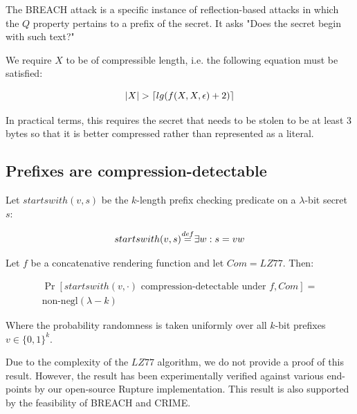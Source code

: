 \documentclass[conference, letterpaper, 10pt]{IEEEtran}
\DeclarePairedDelimiter{\ceil}{\lceil}{\rceil}
\newcommand\defeq{\stackrel{\mathclap{\normalfont\mbox{def}}}{=}}
\begin{document}
The BREACH attack is a specific instance of reflection-based attacks in which
the $Q$ property pertains to a prefix of the secret. It asks "Does the secret
begin with such text?"

We require $X$ to be of compressible length,
i.e. the following equation must be satisfied:

\begin{equation*}
    |X| > \ceil{lg(f(X, X, \epsilon) + 2)}
\end{equation*}

In practical terms, this requires the secret that needs to be stolen to be at
least 3 bytes so that it is better compressed rather than represented as a
literal.

\subsection{Prefixes are
compression-detectable}\label{subsec:breachprefix}

Let $startswith(v, s)$ be the $k$-length prefix checking predicate on a
$\lambda$-bit secret $s$:

\begin{equation*}
    startswith(v, s) \defeq \exists w: s = v w
\end{equation*}

Let $f$ be a concatenative rendering function and let $Com = LZ77$. Then:

\begin{align*}
\Pr[startswith(v, \cdot) \textrm{ compression-detectable under } f, Com] =\\ \text{non-negl}(\lambda - k)
\end{align*}

Where the probability randomness is taken uniformly over all $k$-bit prefixes $v \in \{0, 1\}^k$.

Due to the complexity of the $LZ77$ algorithm, we do not provide a proof of this result. However, the
result has been experimentally verified against various end-points by our open-source Rupture implementation.
This result is also supported by the feasibility of BREACH and CRIME.
\end{document}
